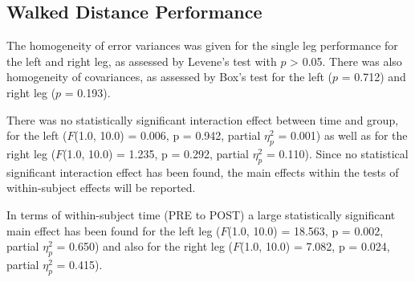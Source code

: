 \subsection{Walked Distance Performance}
The homogeneity of error variances was given for the single leg performance for the left and right leg, as assessed by Levene's test with $p$ > 0.05.
There was also homogeneity of covariances, as assessed by Box's test for the left ($p$ = 0.712) and right leg ($p$ = 0.193).

There was no statistically significant interaction effect between time and group, for the left ($F$(1.0, 10.0) = 0.006, p = 0.942, partial $\eta_{p}^{2}$ = 0.001) as well as for the right leg ($F$(1.0, 10.0) = 1.235, p = 0.292, partial $\eta_{p}^{2}$ = 0.110).
Since no statistical significant interaction effect has been found, the main effects within the tests of within-subject effects will be reported.

In terms of within-subject time (PRE to POST) a large statistically significant main effect has been found for the left leg ($F$(1.0, 10.0) = 18.563, p = 0.002, partial $\eta_{p}^{2}$ = 0.650) and also for the right leg ($F$(1.0, 10.0) = 7.082, p = 0.024, partial $\eta_{p}^{2}$ = 0.415).

